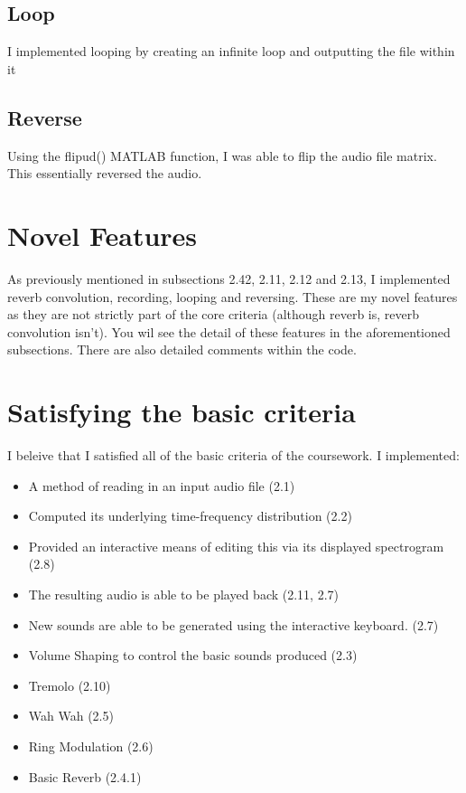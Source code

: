 \documentclass[12pt]{article}
\begin{document}
			\subsection{Loop}

				I implemented looping by creating an infinite loop and outputting the file within it
			
			\subsection{Reverse}
			
				Using the flipud() MATLAB function, I was able to flip the audio file matrix. This essentially reversed the audio.

		\section{Novel Features}

			As previously mentioned in subsections 2.42, 2.11, 2.12 and 2.13, I implemented reverb convolution, recording, looping and reversing. These are my novel features as they are not strictly part of the core criteria (although reverb is, reverb convolution isn't). You wil see the detail of these features in the aforementioned subsections. There are also detailed comments within the code.  

		\section{Satisfying the basic criteria}

			I beleive that I satisfied all of the basic criteria of the coursework. I implemented:
			
			\begin{itemize}
				\item A method of reading in an input audio file (2.1)
				\item Computed its underlying time-frequency distribution (2.2)
				\item Provided an interactive means of editing this via its displayed spectrogram (2.8)
				\item The resulting audio is able to be played back (2.11, 2.7)
				\item New sounds are able to be generated using the interactive keyboard. (2.7)
				\item Volume Shaping to control the basic sounds produced (2.3)
				\item Tremolo (2.10)
				\item Wah Wah (2.5)
				\item Ring Modulation (2.6)
				\item Basic Reverb (2.4.1)
			\end{itemize}
\end{document}
